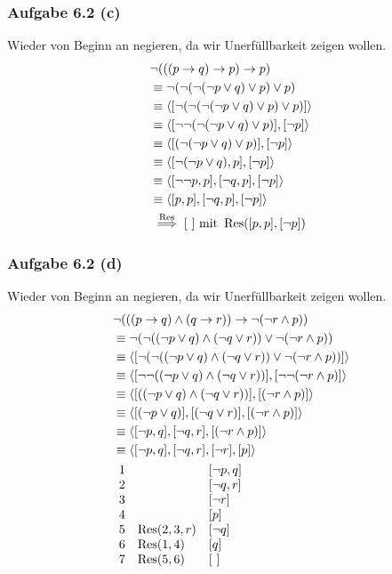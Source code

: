 \subsubsection{Aufgabe 6.2 (c)}
Wieder von Beginn an negieren, da wir Unerfüllbarkeit zeigen wollen.
\begin{align*}
	&\neg(((p\to q)\to p)\to p)\\
	&\equiv
	\neg(\neg(\neg(\neg p\vee q)\vee p)\vee p)\\
	&\equiv
	\langle[\neg(\neg(\neg(\neg p\vee q)\vee p)\vee p)]\rangle\\
	&\equiv
	\langle[\neg\neg(\neg(\neg p\vee q)\vee p)], [\neg p]\rangle\\
	&\equiv
	\langle[(\neg(\neg p\vee q)\vee p)], [\neg p]\rangle\\
	&\equiv
	\langle[\neg(\neg p\vee q), p], [\neg p]\rangle\\
	&\equiv
	\langle[\neg\neg p, p],[\neg q, p], [\neg p]\rangle\\
	&\equiv
	\langle[p, p],[\neg q, p], [\neg p]\rangle\\
	&\overset{\operatorname{Res}}{\implies}[~]\text{ mit }\operatorname{Res}([p,p],[\neg p])
\end{align*}

\subsubsection{Aufgabe 6.2 (d)}
Wieder von Beginn an negieren, da wir Unerfüllbarkeit zeigen wollen.
\begin{align*}
	&\neg(((p\to q)\wedge(q\to r))\to\neg(\neg r\wedge p))\\
	&\equiv
	\neg(\neg((\neg p\vee q)\wedge(\neg q\vee r))\vee\neg(\neg r\wedge p))\\
	&\equiv
	\langle[\neg(\neg((\neg p\vee q)\wedge(\neg q\vee r))\vee\neg(\neg r\wedge p))]\rangle\\
	&\equiv
	\langle[\neg\neg((\neg p\vee q)\wedge(\neg q\vee r))],[\neg\neg(\neg r\wedge p)]\rangle\\
	&\equiv
	\langle[((\neg p\vee q)\wedge(\neg q\vee r))],[(\neg r\wedge p)]\rangle\\
	&\equiv
	\langle[(\neg p\vee q)],[(\neg q\vee r)],[(\neg r\wedge p)]\rangle\\
	&\equiv
	\langle[\neg p, q],[\neg q,r],[(\neg r\wedge p)]\rangle\\
	&\equiv
	\langle[\neg p, q],[\neg q,r],[\neg r],[p]\rangle\\
	&\begin{array}{rll}
		1 &&[\neg p,q]\\
		2 &&[\neg q,r]\\
		3 &&[\neg r]\\
		4 &&[p]\\
		5 & \operatorname{Res}(2,3,r) & [\neg q]\\
		6 & \operatorname{Res}(1,4) & [q]\\
		7 & \operatorname{Res}(5,6) &[~]
	\end{array}
\end{align*}

